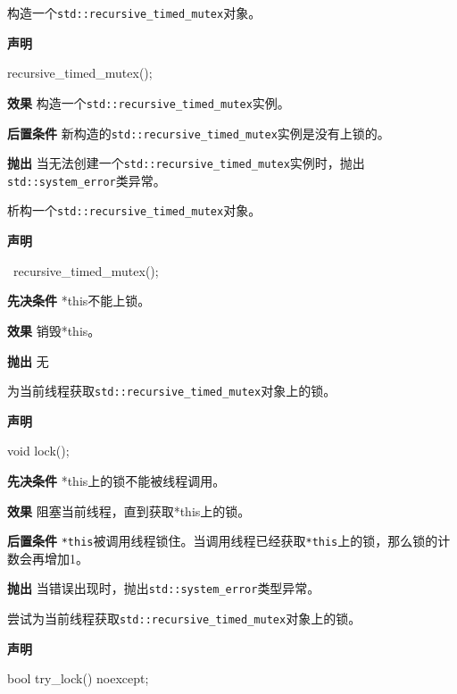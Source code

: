 
构造一个\texttt{std::recursive\_timed\_mutex}对象。

\textbf{声明}

\begin{cpp}
recursive_timed_mutex();
\end{cpp}

\textbf{效果}
构造一个\texttt{std::recursive\_timed\_mutex}实例。

\textbf{后置条件}
新构造的\texttt{std::recursive\_timed\_mutex}实例是没有上锁的。

\textbf{抛出}
当无法创建一个\texttt{std::recursive\_timed\_mutex}实例时，抛出\texttt{std::system\_error}类异常。


析构一个\texttt{std::recursive\_timed\_mutex}对象。

\textbf{声明}

\begin{cpp}
~recursive_timed_mutex();
\end{cpp}

\textbf{先决条件}
*this不能上锁。

\textbf{效果}
销毁*this。

\textbf{抛出}
无


为当前线程获取\texttt{std::recursive\_timed\_mutex}对象上的锁。

\textbf{声明}

\begin{cpp}
void lock();
\end{cpp}

\textbf{先决条件}
*this上的锁不能被线程调用。

\textbf{效果}
阻塞当前线程，直到获取*this上的锁。

\textbf{后置条件}
\texttt{*this}被调用线程锁住。当调用线程已经获取\texttt{*this}上的锁，那么锁的计数会再增加1。

\textbf{抛出}
当错误出现时，抛出\texttt{std::system\_error}类型异常。


尝试为当前线程获取\texttt{std::recursive\_timed\_mutex}对象上的锁。

\textbf{声明}

\begin{cpp}
bool try_lock() noexcept;
\end{cpp}

